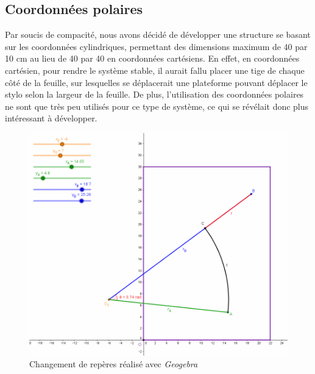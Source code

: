 \documentclass[12pt,a4paper]{report}
\begin{document}
\subsection{Coordonnées polaires}
Par soucis de compacité, nous avons décidé de développer une structure se basant sur les coordonnées cylindriques, permettant des dimensions maximum de 40 par 10 cm au lieu de 40 par 40 en coordonnées cartésiens. En effet, en coordonnées cartésien, pour rendre le système stable, il aurait fallu placer une tige de chaque côté de la feuille, sur lesquelles se déplacerait une plateforme pouvant déplacer le stylo selon la largeur de la feuille. De plus, l'utilisation des coordonnées polaires ne sont que très peu utilisés pour ce type de système, ce qui se révélait donc plus intéressant à développer.
\begin{figure}[!h]
 \center
 \includegraphics[scale=0.5]{../pictures/Changement_repere}
 \caption{Changement de repères réalisé avec \emph{Geogebra}}
\end{figure}
\end{document}
